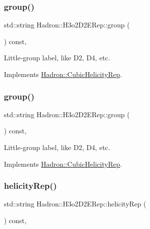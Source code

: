 \subsubsection{\texorpdfstring{group()}{group()}\hspace{0.1cm}{\footnotesize\ttfamily [2/3]}}
{\footnotesize\ttfamily std\+::string Hadron\+::\+H3o2\+D2\+E\+Rep\+::group (\begin{DoxyParamCaption}{ }\end{DoxyParamCaption}) const\hspace{0.3cm}{\ttfamily [inline]}, {\ttfamily [virtual]}}

Little-\/group label, like D2, D4, etc. 

Implements \mbox{\hyperlink{structHadron_1_1CubicHelicityRep_a101a7d76cd8ccdad0f272db44b766113}{Hadron\+::\+Cubic\+Helicity\+Rep}}.

\mbox{\label{structHadron_1_1H3o2D2ERep_ad9d9eb7585ef277acd3efb48c5912c95}} 
\subsubsection{\texorpdfstring{group()}{group()}\hspace{0.1cm}{\footnotesize\ttfamily [3/3]}}
{\footnotesize\ttfamily std\+::string Hadron\+::\+H3o2\+D2\+E\+Rep\+::group (\begin{DoxyParamCaption}{ }\end{DoxyParamCaption}) const\hspace{0.3cm}{\ttfamily [inline]}, {\ttfamily [virtual]}}

Little-\/group label, like D2, D4, etc. 

Implements \mbox{\hyperlink{structHadron_1_1CubicHelicityRep_a101a7d76cd8ccdad0f272db44b766113}{Hadron\+::\+Cubic\+Helicity\+Rep}}.

\mbox{\label{structHadron_1_1H3o2D2ERep_ad3100dd02c2f3ec837e4d589a732d956}} 
\subsubsection{\texorpdfstring{helicityRep()}{helicityRep()}\hspace{0.1cm}{\footnotesize\ttfamily [1/2]}}
{\footnotesize\ttfamily std\+::string Hadron\+::\+H3o2\+D2\+E\+Rep\+::helicity\+Rep (\begin{DoxyParamCaption}{ }\end{DoxyParamCaption}) const\hspace{0.3cm}{\ttfamily [inline]}, {\ttfamily [virtual]}}

